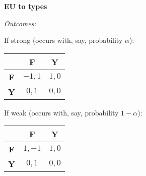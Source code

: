 \documentclass[handout]{beamer}
\begin{document}
\begin{frame}%

\textbf{EU to types}

\textit{Outcomes:}

If strong (occurs with, say, probability $\alpha $): 
\begin{tabular}{|c|c|c|}
\hline
& \textbf{F} & \textbf{Y} \\ \hline
\textbf{F} & $-1,1$ & $1,0$ \\ \hline
\textbf{Y} & $0,1$ & $0,0$ \\ \hline
\end{tabular}

\bigskip

If weak (occurs with, say, probability $1-\alpha $): 
\begin{tabular}{|c|c|c|}
\hline
& \textbf{F} & \textbf{Y} \\ \hline
\textbf{F} & $1,-1$ & $1,0$ \\ \hline
\textbf{Y} & $0,1$ & $0,0$ \\ \hline
\end{tabular}%
\bigskip

\end{frame}%
\end{document}

